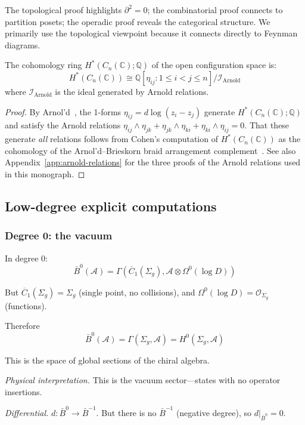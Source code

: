 \begin{remark}\label{rem:three-proofs-one}
The topological proof highlights $\partial^2 = 0$; the combinatorial proof connects to partition posets; the operadic proof reveals the categorical structure.  We primarily use the topological viewpoint because it connects directly to Feynman diagrams.
\end{remark}

\begin{corollary}\label{cor:cohomology-config}
The cohomology ring $H^*(C_n(\mathbb{C}); \mathbb{Q})$ of the open configuration space is:
\[H^*(C_n(\mathbb{C})) \cong \mathbb{Q}[\eta_{ij} : 1 \leq i < j \leq n] / \mathcal{I}_{\text{Arnold}}\]
where $\mathcal{I}_{\text{Arnold}}$ is the ideal generated by Arnold relations.
\end{corollary}

\begin{proof}
By Arnol'd~\cite{Arnold69}, the 1-forms $\eta_{ij} = d\log(z_i - z_j)$ generate $H^*(C_n(\mathbb{C}); \mathbb{Q})$ and satisfy the Arnold relations $\eta_{ij} \wedge \eta_{jk} + \eta_{jk} \wedge \eta_{ki} + \eta_{ki} \wedge \eta_{ij} = 0$.  That these generate \emph{all} relations follows from Cohen's computation of $H^*(C_n(\mathbb{C}))$ as the cohomology of the Arnol'd--Brieskorn braid arrangement complement~\cite{Coh76}.  See also Appendix~\ref{app:arnold-relations} for the three proofs of the Arnold relations used in this monograph.
\end{proof}

\subsection{Low-degree explicit computations}

\subsubsection{Degree 0: the vacuum}

\begin{computation}\label{comp:deg0}
In degree 0:
\[\bar{B}^0(\mathcal{A}) = \Gamma\left(\overline{C}_1(\Sigma_g), \mathcal{A} \otimes \Omega^0(\log D)\right)\]

But $\overline{C}_1(\Sigma_g) = \Sigma_g$ (single point, no collisions), and $\Omega^0(\log D) = \mathcal{O}_{\Sigma_g}$ (functions).

Therefore
\[\bar{B}^0(\mathcal{A}) = \Gamma(\Sigma_g, \mathcal{A}) = H^0(\Sigma_g, \mathcal{A})\]

This is the space of global sections of the chiral algebra.

\emph{Physical interpretation.} This is the vacuum sector---states with no operator insertions.

\emph{Differential.} $d: \bar{B}^0 \to \bar{B}^{-1}$. But there is no $\bar{B}^{-1}$ (negative degree), so $d|_{\bar{B}^0} = 0$.
\end{computation}

